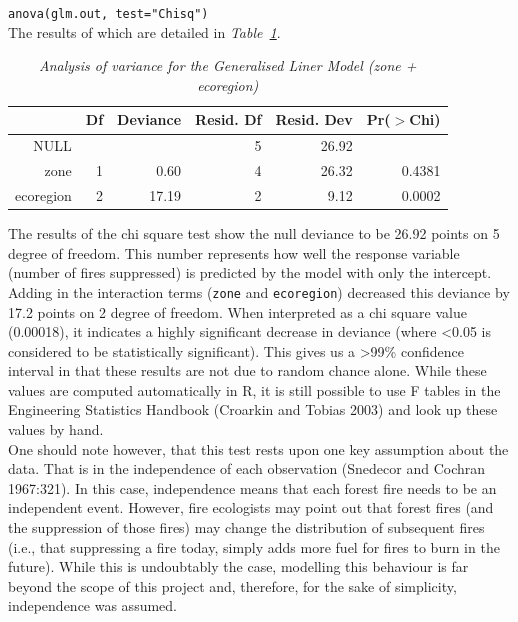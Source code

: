 \begin{spacing}{1.5}
\noindent \texttt{anova(glm.out, test="Chisq")} \\

\noindent The results of which are detailed in \emph{Table~\ref{tab6}}. \\

\begin{table}[ht]
\begin{center}
\begin{tabular}{r|rrrrr}
  \hline
 & Df & Deviance & Resid. Df & Resid. Dev & Pr($>$Chi) \\ 
  \hline
NULL &  &  & 5 & 26.92 &  \\ 
  zone & 1 & 0.60 & 4 & 26.32 & 0.4381 \\ 
  ecoregion & 2 & 17.19 & 2 & 9.12 & 0.0002 \\ 
   \hline
\end{tabular}
\caption[Analysis of variance for the GLM (zone + ecoregion)]{\emph{Analysis of variance for the Generalised Liner Model (zone + ecoregion)}}
\label{tab6}
\end{center}
\end{table}
\noindent The results of the chi square test show the null deviance to be 26.92 points on 5 degree of freedom. This number represents how well the response variable (number of fires suppressed) is predicted by the model with only the intercept. Adding in the interaction terms (\texttt{zone} and \texttt{ecoregion}) decreased this deviance by 17.2 points on 2 degree of freedom. When interpreted as a chi square value (0.00018), it indicates a highly significant decrease in deviance (where <0.05 is considered to be statistically significant). This gives us a >99\% confidence interval in that these results are not due to random chance alone. While these values are computed automatically in R, it is still possible to use F tables in the Engineering Statistics Handbook (Croarkin and Tobias 2003) and look up these values by hand. \\

\noindent One should note however, that this test rests upon one key assumption about the data. That is in the independence of each observation (Snedecor and Cochran 1967:321). In this case, independence means that each forest fire needs to be an independent event. However, fire ecologists may point out that forest fires (and the suppression of those fires) may change the distribution of subsequent fires (i.e., that suppressing a fire today, simply adds more fuel for fires to burn in the future). While this is undoubtably the case, modelling this behaviour is far beyond the scope of this project and, therefore, for the sake of simplicity, independence was assumed. \\


\end{spacing}
